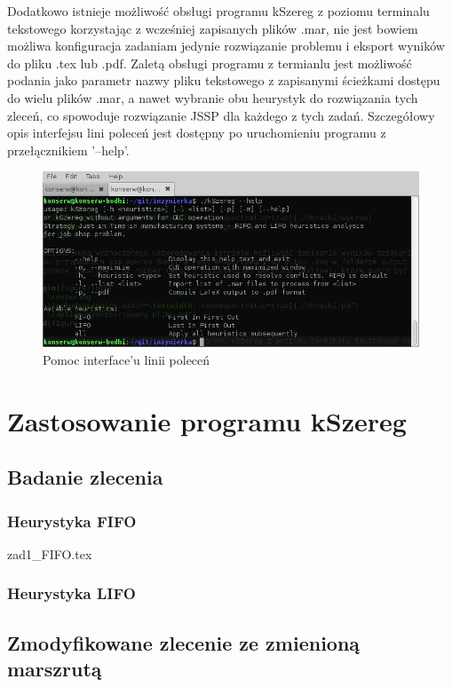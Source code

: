 \documentclass[twoside]{kInzynierka}
\begin{document}
Dodatkowo istnieje możliwość obsługi programu kSzereg z poziomu terminalu tekstowego korzystając z wcześniej zapisanych plików .mar, nie jest bowiem możliwa konfiguracja zadaniam jedynie rozwiązanie problemu i eksport wyników do pliku .tex lub .pdf. Zaletą obsługi programu z termianlu jest możliwość podania jako parametr nazwy pliku tekstowego z zapisanymi ścieżkami dostępu do wielu plików .mar, a nawet wybranie obu heurystyk do rozwiązania tych zleceń, co spowoduje rozwiązanie JSSP dla każdego z tych zadań. Szczegółowy opis interfejsu lini poleceń jest dostępny po uruchomieniu programu z przełącznikiem '--help'.

\begin{figure}[htb]
    \centering
    \includegraphics[width=\textwidth, keepaspectratio=true]{./obrazki/cli}
    \caption{Pomoc interface'u linii poleceń}
\end{figure}

   
\section        {Zastosowanie programu kSzereg}
       
\subsection     {Badanie zlecenia}
\label{sec:z1}
\subsubsection  {Heurystyka FIFO}
\label{sec:z1f}
 {zad1_FIFO.tex}
\subsubsection  {Heurystyka LIFO}
\label{sec:z1l}


\newpage
\subsection     {Zmodyfikowane zlecenie ze zmienioną marszrutą}
\label{sec:z2}
\end{document}
